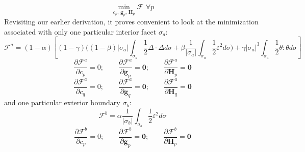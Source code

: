 \documentclass[11pt]{article} %
\begin{document}
\begin{equation}
	\min_{c_p, \, \mathbf{g}_p, \, \mathbf{H}_p} \mathcal{F} \, \, \forall p
\end{equation}
Revisiting our earlier derivation, it proves convenient to look at the minimization associated with only one particular interior facet $\sigma_a$:
\begin{equation}
	\mathcal{F}^a = (1-\alpha) \left[ (1-\gamma) \bigg( (1-\beta) | \sigma_a | \int_{\sigma_a} \frac{1}{2} \Delta \cdot \Delta d \sigma + \beta \frac{1}{| \sigma_a |} \int_{\sigma_a} \frac{1}{2} \varepsilon^2 d \sigma \bigg) + \gamma | \sigma_a |^3 \int_{\sigma_a} \frac{1}{2} \theta \colon \theta d \sigma \right]
\end{equation}
\begin{equation}
	\frac{\partial \mathcal{F}^a}{\partial c_p} = 0; \qquad \frac{\partial \mathcal{F}^a}{\partial \mathbf{g}_p} = \mathbf{0}; \qquad \frac{\partial \mathcal{F}^a}{\partial \mathbf{H}_p} = \mathbf{0}
\end{equation}
\begin{equation}
	\frac{\partial \mathcal{F}^a}{\partial c_q} = 0; \qquad \frac{\partial \mathcal{F}^a}{\partial \mathbf{g}_q} = \mathbf{0}; \qquad \frac{\partial \mathcal{F}^a}{\partial \mathbf{H}_q} = \mathbf{0}
\end{equation}
and one particular exterior boundary $\sigma_b$:
\begin{equation}
	\mathcal{F}^b = \alpha \frac{1}{| \sigma_b |} \int_{\sigma_b} \frac{1}{2} \varepsilon^2 d \sigma
\end{equation}
\begin{equation}
	\frac{\partial \mathcal{F}^b}{\partial c_p} = 0; \qquad \frac{\partial \mathcal{F}^b}{\partial \mathbf{g}_p} = \mathbf{0}; \qquad \frac{\partial \mathcal{F}^b}{\partial \mathbf{H}_p} = \mathbf{0}
\end{equation}
\end{document}
